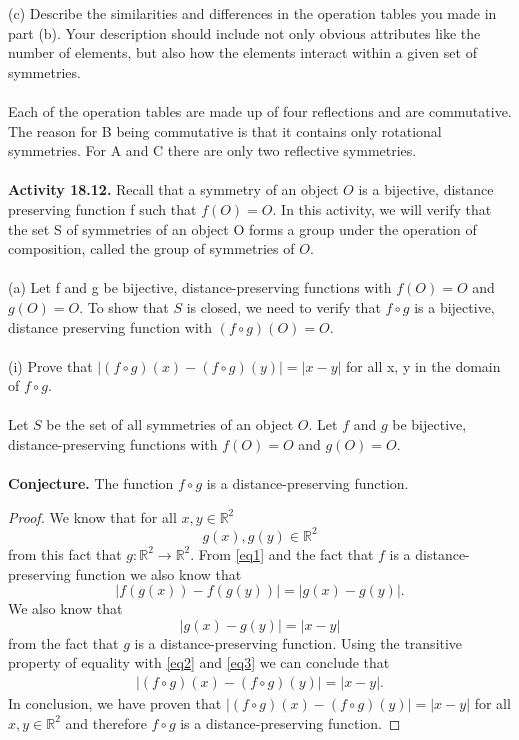 \documentclass[11pt,a4paper]{article}
\begin{document}
(c) Describe the similarities and differences in the operation tables you made in part (b). Your description should include not only obvious attributes like the number of elements, but also how the elements interact within a given set of symmetries.\\
~\\
Each of the operation tables are made up of four reflections and are commutative. The reason for B being commutative is that it contains only rotational symmetries. For A and C there are only two reflective symmetries.\\
~\vspace{10mm}\\
{\bf Activity 18.12.} Recall that a symmetry of an object $O$ is a bijective, distance preserving function f such that $f (O) = O$. In this activity, we will verify that the set S of symmetries of an object O forms a group under the operation of composition, called the group of symmetries of $O$.\\
~\\
(a) Let f and g be bijective, distance-preserving functions with $f (O) = O$
and $g(O) = O$. To show that $S$ is closed, we need to verify that $f \circ g$ is a
bijective, distance preserving function with $(f \circ g)(O) = O$.\\
~\\
(i) Prove that $|(f \circ g)(x) − (f \circ g)(y)| = |x - y|$ for all x, y in the
domain of $f \circ g$.\\
~\\
Let $S$ be the set of all symmetries of an object $O$. Let $f$ and $g$ be bijective, distance-preserving functions with $f(O)=O$ and $g(O)=O$.\\
~\\
{\bf Conjecture.} The function $f\circ g$ is a distance-preserving function.\\
\begin{proof}
We know that for all $x,y\in\mathbb{R}^2$
\begin{equation}\label{eq1}
g(x),g(y)\in\mathbb{R}^2
\end{equation}
from this fact that $g:\mathbb{R}^2\rightarrow\mathbb{R}^2$. From \eqref{eq1}  and the fact that $f$ is a distance-preserving function we also know that
\begin{equation}\label{eq2}
|f(g(x))-f(g(y))| = |g(x)-g(y)|.
\end{equation}
We also know that
\begin{equation}\label{eq3}
|g(x)-g(y)| = |x-y|
\end{equation}
from the fact that $g$ is a distance-preserving function. Using the transitive property of equality with \eqref{eq2} and \eqref{eq3} we can conclude that
\begin{align*}
|(f\circ g)(x)-(f\circ g)(y)| = |x-y|.
\end{align*}
In conclusion, we have proven that $|(f\circ g)(x)-(f\circ g)(y)| = |x-y|$ for all $x,y\in\mathbb{R}^2$ and therefore $f\circ g$ is a distance-preserving function.
\end{proof}
\end{document}
